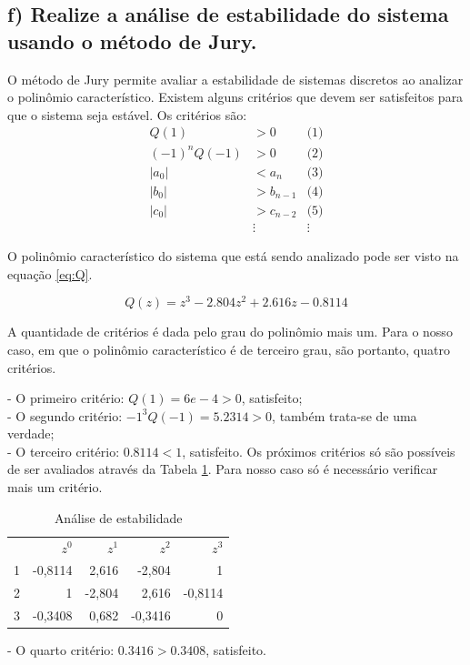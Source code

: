    \subsection*{f) Realize a análise de estabilidade do sistema usando o método de Jury.}  
        O método de Jury permite avaliar a estabilidade de sistemas discretos ao analizar o polinômio característico.
        Existem alguns critérios que devem ser satisfeitos para que o sistema seja estável. Os critérios são: 
        \begin{align*}
            Q(1) &> 0  &\text{(1)}\\
            (-1)^n Q(-1) &> 0 &\text{(2)}\\
            |a_0| &< a_n &\text{(3)}\\
            |b_0| &> b_{n-1} &\text{(4)}\\
            |c_0| &> c_{n-2} &\text{(5)} \\
            &\vdots &\vdots 
        \end{align*} 

        O polinômio característico do sistema
        que está sendo analizado pode ser visto na equação \ref{eq:Q}.

        \begin{equation}
            Q(z) = z^3 - 2.804 z^2 + 2.616 z - 0.8114
            \label{eq:Q}
        \end{equation}
        
        A quantidade de critérios é dada pelo grau do polinômio mais um. Para o nosso caso, em que o polinômio característico é 
        de terceiro grau, são portanto, quatro critérios. 
        
        - O primeiro critério: $Q(1)= 6e-4 > 0$, satisfeito; \\
        - O segundo critério: $-1^3 Q(-1) = 5.2314 > 0$, também trata-se de uma verdade;\\
        - O terceiro critério: $0.8114 < 1$, satisfeito.
        \newpage
        Os  próximos critérios só são possíveis de ser avaliados através da Tabela \ref{tab:J1}. Para nosso caso só é necessário verificar mais um 
        critério. 
        \begin{table}[!ht]
            \centering
            \caption{Análise de estabilidade} 
            \begin{tabular}{l r r r r}
                 & $z^0$ & $z^1$ & $z^2$ & $z^3$\\
                1 & -0{,}8114 & 2{,}616 & -2{,}804 & 1\\
                2 & 1 & -2{,}804 & 2{,}616 & -0{,}8114\\
                3 & -0{,}3408 & 0{,}682 & -0{,}3416 & 0\\
            \end{tabular}                
            \label{tab:J1}
        \end{table}

        - O quarto critério: $0.3416 > 0.3408$, satisfeito. 

         
        
        